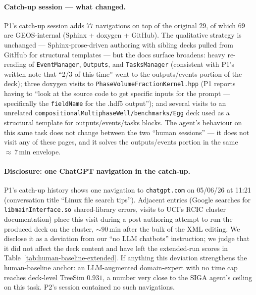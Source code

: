 \documentclass{article}
\begin{document}
\paragraph{Catch-up session --- what changed.} P1's catch-up session adds $77$ navigations on top of the original $29$, of which $69$ are GEOS-internal (Sphinx + doxygen + GitHub). The qualitative strategy is unchanged --- Sphinx-prose-driven authoring with sibling decks pulled from GitHub for structural templates --- but the docs surface broadens: heavy re-reading of \texttt{EventManager}, \texttt{Outputs}, and \texttt{TasksManager} (consistent with P1's written note that ``2/3 of this time'' went to the outputs/events portion of the deck); three doxygen visits to \texttt{PhaseVolumeFractionKernel.hpp} (P1 reports having to ``look at the source code to get specific inputs for the prompt --- specifically the \texttt{fieldName} for the .hdf5 output''); and several visits to an unrelated \texttt{compositionalMultiphaseWell/benchmarks/Egg} deck used as a structural template for outputs/events/tasks blocks. The agent's behaviour on this same task does not change between the two ``human sessions'' --- it does not visit any of these pages, and it solves the outputs/events portion in the same ${\approx}\,7\,$min envelope.

\paragraph{Disclosure: one ChatGPT navigation in the catch-up.} P1's catch-up history shows one navigation to \texttt{chatgpt.com} on 05/06/26 at 11:21 (conversation title ``Linux file search tips''). Adjacent entries (Google searches for \texttt{libmainInterface.so} shared-library errors, visits to UCI's RCIC cluster documentation) place this visit during a post-authoring attempt to run the produced deck on the cluster, ${\sim}90\,$min after the bulk of the XML editing. We disclose it as a deviation from our ``no LLM chatbots'' instruction; we judge that it did not affect the deck content and have left the extended-run scores in Table~\ref{tab:human-baseline-extended}. If anything this deviation strengthens the human-baseline anchor: an LLM-augmented domain-expert with no time cap reaches deck-level TreeSim $0.931$, a number very close to the SIGA agent's ceiling on this task. P2's session contained no such navigations.
\end{document}
